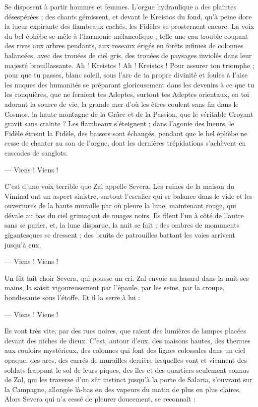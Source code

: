 \documentclass[a4paper, 11pt, oneside, polutonikogreek, french]{article}
\begin{document}
Se disposent à partir hommes et femmes. L'orgue hydraulique a des plaintes désespérées ; des chants gémissent, et devant le Kreistos du fond, qu'à peine dore la lueur expirante des flambeaux cachés, les Fidèles se prosternent encore. La voix du bel éphèbe se mêle à l'harmonie mélancolique ; telle une eau trouble coupant des rives aux arbres pendants, aux roseaux érigés en forêts infinies de colonnes balancées, avec des trouées de ciel gris, des trouées de paysages inviolés dans leur majesté brouillassante. Ah ! Kreistos ! Ah ! Kreistos ! Pour assurer ton triomphe ; pour que tu passes, blanc soleil, sous l'arc de ta propre divinité et foules à l'aise les nuques des humanités se préparant glorieusement dans les devenirs à ce que tu les conquières, que ne feraient tes Adeptes, surtout tes Adeptes orientaux, en toi adorant la source de vie, la grande mer d'où les êtres coulent sans fin dans le Cosmos, la haute montagne de la Grâce et de la Passion, que le véritable Croyant gravit sans crainte ? Les flambeaux s'éteignent ; dans l'agonie des lueurs, le Fidèle étreint la Fidèle, des baisers sont échangés, pendant que le bel éphèbe ne cesse de chanter au son de l'orgue, dont les dernières trépidations s'achèvent en cascades de sanglots.

--- Viens ! Viens !

C'est d'une voix terrible que Zal appelle Severa. Les ruines de la maison du Viminal ont un aspect sinistre, surtout l'escalier qui se balance dans le vide et les ouvertures de la haute muraille par où pleure la lune, maintenant rouge, qui dévale au bas du ciel grimaçant de nuages noirs. Ils filent l'un à côté de l'autre sans se parler, et, la lune disparue, la nuit se fait ; des ombres de monuments gigantesques se dressent ; des bruits de patrouilles battant les voies arrivent jusqu'à eux.

--- Viens ! Viens !

Un fût fait choir Severa, qui pousse un cri. Zal envoie au hasard dans la nuit ses mains, la saisit vigoureusement par l'épaule, par les seins, par la croupe, bondissante sous l'étoffe. Et il la serre à lui :

--- Viens ! Viens !

Ils vont très vite, par des rues noires, que raient des lumières de lampes placées devant des niches de dieux. C'est, autour d'eux, des maisons hautes, des thermes aux couloirs mystérieux, des colonnes qui font des lignes colossales dans un ciel opaque, des arcs, des carrés de murailles derrière lesquelles vont et viennent des soldats frappant le sol de leurs piques, des îles et des quartiers seulement connus de Zal, qui les traverse d'un sûr instinct jusqu'à la porte de Salaria, s’ouvrant sur la Campagne, allongée là-bas en des vapeurs du matin de plus en plus claires. Alors Severa qui n'a cessé de pleurer doucement, se reconnaît :
\end{document}

